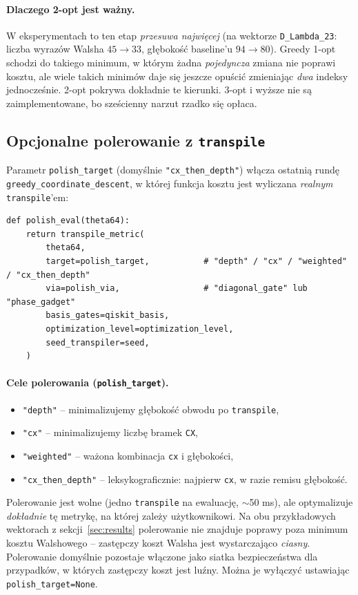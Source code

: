 \documentclass[11pt,a4paper]{article}
\newcommand{\1}{\mathbf{1}}
\newcommand{\code}[1]{\texttt{#1}}
\begin{document}
\paragraph{Dlaczego 2-opt jest ważny.} W eksperymentach to ten etap
\emph{przesuwa najwięcej} (na wektorze \code{D\_Lambda\_23}: liczba
wyrazów Walsha $45\to 33$, głębokość baseline'u $94\to 80$). Greedy
1-opt schodzi do takiego minimum, w którym żadna \emph{pojedyncza}
zmiana nie poprawi kosztu, ale wiele takich minimów daje się jeszcze
opuścić zmieniając \emph{dwa} indeksy jednocześnie. 2-opt pokrywa
dokładnie te kierunki. 3-opt i wyższe nie są zaimplementowane, bo
sześcienny narzut rzadko się opłaca.

\subsection{Opcjonalne polerowanie z \texttt{transpile}}
\label{sec:polish}

Parametr \code{polish\_target} (domyślnie \code{"cx\_then\_depth"})
włącza ostatnią rundę \code{greedy\_coordinate\_descent}, w której
funkcja kosztu jest wyliczana \emph{realnym} \code{transpile}'em:
\begin{lstlisting}
def polish_eval(theta64):
    return transpile_metric(
        theta64,
        target=polish_target,           # "depth" / "cx" / "weighted" / "cx_then_depth"
        via=polish_via,                 # "diagonal_gate" lub "phase_gadget"
        basis_gates=qiskit_basis,
        optimization_level=optimization_level,
        seed_transpiler=seed,
    )
\end{lstlisting}

\paragraph{Cele polerowania (\code{polish\_target}).}
\begin{itemize}[leftmargin=*]
  \item \code{"depth"} -- minimalizujemy głębokość obwodu po
        \code{transpile},
  \item \code{"cx"} -- minimalizujemy liczbę bramek \code{CX},
  \item \code{"weighted"} -- ważona kombinacja \code{cx} i głębokości,
  \item \code{"cx\_then\_depth"} -- leksykograficznie:
        najpierw \code{cx}, w razie remisu głębokość.
\end{itemize}
Polerowanie jest wolne (jedno \code{transpile} na ewaluację, $\sim$50
ms), ale optymalizuje \emph{dokładnie} tę metrykę, na której zależy
użytkownikowi. Na obu przykładowych wektorach z sekcji~\ref{sec:results}
polerowanie nie znajduje poprawy poza minimum kosztu Walshowego --
zastępczy koszt Walsha jest wystarczająco \emph{ciasny}. Polerowanie
domyślnie pozostaje włączone jako siatka bezpieczeństwa dla
przypadków, w których zastępczy koszt jest luźny. Można je wyłączyć
ustawiając \code{polish\_target=None}.
\end{document}
